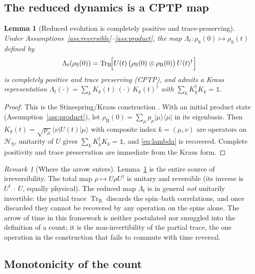 \documentclass[twocolumn,10pt,a4paper]{article}
\theoremstyle{thmstyle}
\newtheorem{lemma}[theorem]{Lemma}
\theoremstyle{definition}
\theoremstyle{remark}
\newtheorem{remark}[theorem]{Remark}
\newcommand{\Hilb}{\mathcal{H}}
\newcommand{\Tr}{\operatorname{Tr}}
\newcommand{\sysrho}{\rho_{\mathrm{S}}}
\begin{document}
\subsection{The reduced dynamics is a CPTP map}

\begin{lemma}[Reduced evolution is completely positive and
trace-preserving]
\label{lem:cptp}
Under Assumptions~\ref{ass:reversible}--\ref{ass:product}, the map
$\Lambda_{t}:\sysrho(0)\mapsto\sysrho(t)$ defined by
\begin{equation}
\Lambda_{t}(\sysrho(0))
=\Tr_{\mathrm{B}}\!\Bigl[U(t)\,
\bigl(\sysrho(0)\otimes\rho_{\mathrm{B}}(0)\bigr)\,U(t)^{\dagger}\Bigr]
\label{eq:lambda}
\end{equation}
is completely positive and trace preserving (CPTP), and admits a
Kraus representation $\Lambda_{t}(\cdot)=\sum_{k}K_{k}(t)\,(\cdot)\,
K_{k}(t)^{\dagger}$ with $\sum_{k}K_{k}^{\dagger}K_{k}=\mathbb{1}$.
\end{lemma}

\begin{proof}
This is the Stinespring/Kraus construction \citep{nielsen2010,breuer2002}.
With an initial product state (Assumption~\ref{ass:product}), let
$\rho_{\mathrm{B}}(0)=\sum_{\mu}p_{\mu}|\mu\rangle\langle\mu|$ in its
eigenbasis. Then
$K_{k}(t)=\sqrt{p_{\mu}}\,\langle\nu|U(t)|\mu\rangle$ with composite index
$k=(\mu,\nu)$ are operators on $\Hilb_{\mathrm{S}}$, unitarity of $U$ gives
$\sum_{k}K_{k}^{\dagger}K_{k}=\mathbb{1}$, and \eqref{eq:lambda} is
recovered. Complete positivity and trace preservation are immediate from
the Kraus form.
\end{proof}

\begin{remark}[Where the arrow enters]
\label{rem:arrow}
Lemma~\ref{lem:cptp} is the entire source of irreversibility. The total
map $\rho\mapsto U\rho U^{\dagger}$ is unitary and reversible (its inverse
is $U^{\dagger}\,\cdot\,U$, equally physical). The reduced map
$\Lambda_{t}$ is in general \emph{not} unitarily invertible: the partial
trace $\Tr_{\mathrm{B}}$ discards the spin--bath correlations, and once
discarded they cannot be recovered by any operation on the spins alone.
The arrow of time in this framework is neither postulated nor smuggled
into the definition of a count; it is the non-invertibility of the partial
trace, the one operation in the construction that fails to commute with
time reversal.
\end{remark}

\subsection{Monotonicity of the count}
\end{document}
